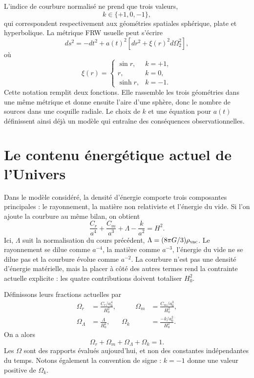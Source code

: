 L’indice de courbure normalisé ne prend que trois valeurs,
\begin{equation}
k\in\{+1,0,-1\},
\end{equation}
qui correspondent respectivement aux géométries spatiales sphérique, plate et hyperbolique. La métrique FRW usuelle peut s’écrire
\begin{equation}
ds^2=-dt^2+a(t)^2\left[dr^2+\xi(r)^2d\Omega_2^2\right],
\label{eq:c06-frw}
\end{equation}
où
\begin{equation}
\xi(r)=
\begin{cases}
\sin r, & k=+1,\\
r, & k=0,\\
\sinh r, & k=-1.
\end{cases}
\label{eq:c06-xi}
\end{equation}
Cette notation remplit deux fonctions. Elle rassemble les trois géométries dans une même métrique et donne ensuite l’aire d’une sphère, donc le nombre de sources dans une coquille radiale. Le choix de \(k\) et une équation pour \(a(t)\) définissent ainsi déjà un modèle qui entraîne des conséquences observationnelles.

\section{Le contenu énergétique actuel de l’Univers}

Dans le modèle considéré, la densité d’énergie comporte trois composantes principales : le rayonnement, la matière non relativiste et l’énergie du vide. Si l’on ajoute la courbure au même bilan, on obtient
\begin{equation}
\frac{C_r}{a^4}
+\frac{C_m}{a^3}
+\Lambda
-\frac{k}{a^2}
=H^2.
\label{eq:c06-budget}
\end{equation}
Ici, \(\Lambda\) suit la normalisation du cours précédent, \(\Lambda=(8\pi G/3)\rho_{\rm vac}\). Le rayonnement se dilue comme \(a^{-4}\), la matière comme \(a^{-3}\), l’énergie du vide ne se dilue pas et la courbure évolue comme \(a^{-2}\). La courbure n’est pas une densité d’énergie matérielle, mais la placer à côté des autres termes rend la contrainte actuelle explicite : les quatre contributions doivent totaliser \(H_0^2\).

Définissons leurs fractions actuelles par
\begin{equation}
\begin{aligned}
\Omega_r&=\frac{C_r/a_0^4}{H_0^2},
&\qquad
\Omega_m&=\frac{C_m/a_0^3}{H_0^2},\\
\Omega_\Lambda&=\frac{\Lambda}{H_0^2},
&
\Omega_k&=\frac{-k/a_0^2}{H_0^2}.
\end{aligned}
\label{eq:c06-omegas}
\end{equation}
On a alors
\begin{equation}
\boxed{\Omega_r+\Omega_m+\Omega_\Lambda+\Omega_k=1.}
\label{eq:c06-sum-rule}
\end{equation}
Les \(\Omega\) sont des rapports évalués aujourd’hui, et non des constantes indépendantes du temps. Notons également la convention de signe : \(k=-1\) donne une valeur positive de \(\Omega_k\).

